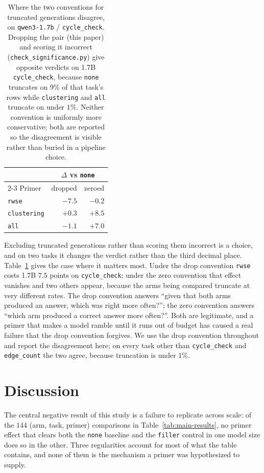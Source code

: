 \documentclass[11pt]{article}
\begin{document}
\begin{table}[t]
\centering
\small
\begin{tabular}{lrr}
\toprule
& \multicolumn{2}{c}{$\Delta$ vs \texttt{none}} \\
\cmidrule(lr){2-3}
Primer & dropped & zeroed \\
\midrule
\texttt{rwse}       & $\mathbf{-7.5}$ & $-0.2$ \\
\texttt{clustering} & $+0.3$ & $\mathbf{+8.5}$ \\
\texttt{all}        & $-1.1$ & $\mathbf{+7.0}$ \\
\bottomrule
\end{tabular}
\caption{Where the two conventions for truncated generations disagree, on
\texttt{qwen3-1.7b} / \texttt{cycle\_check}.
Dropping the pair (this paper) and scoring it incorrect
(\texttt{check\_significance.py}) give opposite verdicts on 1.7B
\texttt{cycle\_check}, because \texttt{none} truncates on $9\%$ of that
task's rows while \texttt{clustering} and \texttt{all} truncate on under
$1\%$. Neither convention is uniformly more conservative; both are reported
so the disagreement is visible rather than buried in a pipeline choice.}
\label{tab:sensitivity}
\end{table}

Excluding truncated generations rather than scoring them incorrect is a
choice, and on two tasks it changes the verdict rather than the third
decimal place. Table~\ref{tab:sensitivity} gives the case where it matters
most. Under the drop convention \texttt{rwse} costs 1.7B $7.5$ points on
\texttt{cycle\_check}; under the zero convention that effect vanishes and
two others appear, because the arms being compared truncate at very
different rates. The drop convention answers ``given that both arms
produced an answer, which was right more often?''; the zero convention
answers ``which arm produced a correct answer more often?''. Both are
legitimate, and a primer that makes a model ramble until it runs out of
budget has caused a real failure that the drop convention forgives. We use
the drop convention throughout and report the disagreement here; on every
task other than \texttt{cycle\_check} and \texttt{edge\_count} the two
agree, because truncation is under $1\%$.

\section{Discussion}
\label{sec:discussion}

The central negative result of this study is a failure to replicate across
scale: of the $144$ (arm, task, primer) comparisons in
Table~\ref{tab:main-results}, no primer effect that clears both the
\texttt{none} baseline and the \texttt{filler} control in one model size
does so in the other. Three regularities account for most of what the table
contains, and none of them is the mechanism a primer was hypothesized to
supply.
\end{document}
